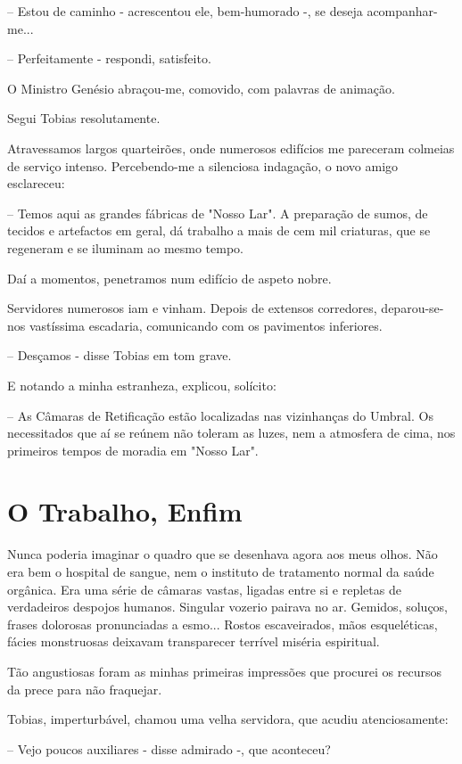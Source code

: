 \documentclass[portuguese,12pt,a4paper]{scrbook}
\begin{document}
	– Estou de caminho - acrescentou ele, bem-humorado -, se deseja acompanhar-me...
	
	– Perfeitamente - respondi, satisfeito.
	
	O Ministro Genésio abraçou-me, comovido, com palavras de animação.
	
	Segui Tobias resolutamente.
	
	Atravessamos largos quarteirões, onde numerosos edifícios me pareceram colmeias de serviço intenso. Percebendo-me a silenciosa indagação, o novo amigo esclareceu:
	
	
	– Temos aqui as grandes fábricas de "Nosso Lar". A preparação de sumos, de tecidos e artefactos em geral, dá trabalho a mais de cem mil criaturas, que se regeneram e se iluminam ao mesmo tempo.
	
	Daí a momentos, penetramos num edifício de aspeto nobre.
	
	Servidores numerosos iam e vinham. Depois de extensos corredores, deparou-se-nos vastíssima escadaria, comunicando com os pavimentos inferiores.
	
	– Desçamos - disse Tobias em tom grave.
	
	E notando a minha estranheza, explicou, solícito:
	
	– As Câmaras de Retificação estão localizadas nas vizinhanças do Umbral. Os necessitados que aí se reúnem não toleram as luzes, nem a atmosfera de cima, nos primeiros tempos de moradia em "Nosso Lar".
	
	
	\chapter{O Trabalho, Enfim}
	
	Nunca poderia imaginar o quadro que se desenhava agora aos meus olhos. Não era bem o hospital de sangue, nem o instituto de tratamento normal da saúde orgânica. Era uma série de câmaras vastas, ligadas entre si e repletas de verdadeiros despojos humanos. Singular vozerio pairava no ar. Gemidos, soluços, frases dolorosas pronunciadas a esmo... Rostos escaveirados, mãos esqueléticas, fácies monstruosas deixavam transparecer terrível miséria espiritual.
	
	Tão angustiosas foram as minhas primeiras impressões que procurei os recursos da prece para não fraquejar.
	
	Tobias, imperturbável, chamou uma velha servidora, que acudiu atenciosamente:
	
	– Vejo poucos auxiliares - disse admirado -, que aconteceu?
	
\end{document}
